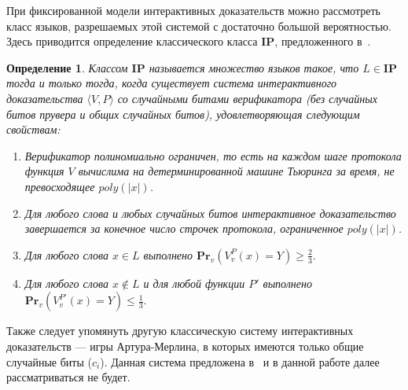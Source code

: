 \documentclass[14pt, a4paper]{extreport}
\newtheorem{definition}{\indent Определение}
\newcommand{\poly}{\textit{poly}}
\newcommand{\pr}[2]{\textbf{Pr}_{#1}\left(#2\right)}
\begin{document}
При фиксированной модели интерактивных доказательств можно рассмотреть класс языков, разрешаемых этой системой с достаточно большой вероятностью. Здесь приводится определение классического класса $\textbf{IP}$, предложенного в~\cite{goldwasser1989ip}.
\begin{definition}\label{ip}
    Классом $\textbf{IP}$ называется множество языков такое, что $L \in \textbf{IP}$ тогда и только тогда, когда существует система интерактивного доказательства $\langle V, P\rangle$ со случайными битами верификатора (без случайных битов прувера и общих случайных битов), удовлетворяющая следующим свойствам:
    \begin{enumerate}
        \item Верификатор полиномиально ограничен, то есть на каждом шаге протокола функция $V$ вычислима на детерминированной машине Тьюринга за время, не превосходящее $\poly(|x|)$.
        \item Для любого слова и любых случайных битов интерактивное доказательство завершается за конечное число строчек протокола, ограниченное $\poly(|x|)$.
        \item Для любого слова $x \in L$ выполнено $\pr{v}{V^P_{v}(x) = Y} \geqslant \frac{2}{3}.$
        \item Для любого слова $x \notin L$ и для любой функции $P'$ выполнено\\$\pr{v}{V^{P'}_{v}(x) = Y} \leqslant \frac{1}{3}.$
    \end{enumerate}
\end{definition}
Также следует упомянуть другую классическую систему интерактивных доказательств --- игры Артура-Мерлина, в которых имеются только общие случайные биты ($c_{i}$). Данная система предложена в~\cite{babai1988arthur} и в данной работе далее рассматриваться не будет.
\end{document}
